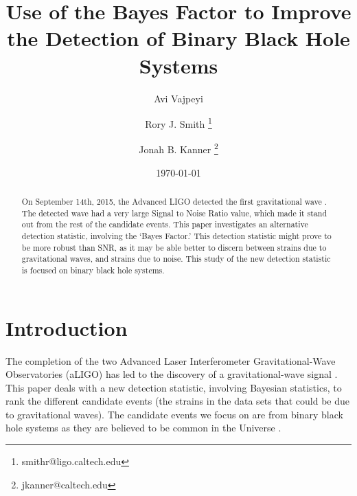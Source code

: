 \documentclass{article}
\title{Use of the Bayes Factor to Improve the Detection of Binary Black Hole Systems} %
\author[1]{Avi Vajpeyi }
\author[2]{Rory J. Smith \thanks{smith\textunderscore r@ligo.caltech.edu}}
\author[2]{Jonah B. Kanner \thanks{jkanner@caltech.edu}}
\affil[1]{The College of Wooster, Wooster, OH 44691, USA}
\affil[2]{LIGO Laboratory, California Institute of Technology, Pasadena, CA 91125, USA}
\date{\today} %
\begin{document}
\maketitle %






 \begin{abstract}
On September 14th, 2015, the Advanced LIGO detected the first gravitational wave \cite{DetectionPaper}. The detected wave had a very large Signal to Noise Ratio value, which made it stand out from the rest of the candidate events. This paper investigates an alternative detection statistic, involving the `Bayes Factor.' This detection statistic might prove to be more robust than SNR, as it may be able better to discern between strains due to gravitational waves, and strains due to noise. This study of the new detection statistic is focused on binary black hole systems. 


\end{abstract}  





\section{Introduction}

\indent The completion of the two Advanced Laser Interferometer Gravitational-Wave Observatories (aLIGO) has led to the discovery of a gravitational-wave signal \cite{DetectionPaper}. This paper deals with a new detection statistic, involving Bayesian statistics, to rank the different candidate events (the strains in the data sets that could be due to gravitational waves). The candidate events we focus on are from binary black hole systems as they are believed to be common in the Universe \cite{NumDetections}.\\
\end{document}
